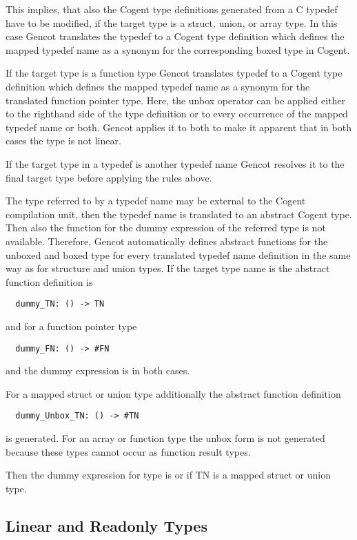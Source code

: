 This implies, that also the Cogent type definitions generated from a C typedef have to be modified, if
the target type is a struct, union, or array type. In this case Gencot translates the typedef 
to a Cogent type definition which defines the mapped typedef name as a synonym 
for the corresponding boxed type in Cogent.

If the target type is a function type Gencot translates typedef to a Cogent type definition which
defines the mapped typedef name as a synonym for the translated function pointer type. Here, the unbox
operator can be applied either to the righthand side of the type definition or to every occurrence
of the mapped typedef name or both. Gencot applies it to both to make it apparent that in both cases
the type is not linear.

If the target type in a typedef is another typedef name Gencot resolves it to the final target type
before applying the rules above.

The type referred to by a typedef name may be external to the Cogent compilation unit, then the typedef name
is translated to an abstract Cogent type. Then also the function for the dummy expression of the referred
type is not available. Therefore, Gencot automatically defines abstract functions for the unboxed and 
boxed type for every translated typedef name definition in the same way as for structure and union types.
If the target type name is  the abstract function definition is
\begin{verbatim}
  dummy_TN: () -> TN
\end{verbatim}
and for a function pointer type 
\begin{verbatim}
  dummy_FN: () -> #FN
\end{verbatim}
and the dummy expression is  in both cases.

For a mapped struct or union type additionally the abstract function definition
\begin{verbatim}
  dummy_Unbox_TN: () -> #TN
\end{verbatim}
is generated. For an array or function type the unbox form is not generated because these types cannot occur
as function result types.

Then the dummy expression for type  is  or  if 
TN is a mapped struct or union type.

\subsection{Linear and Readonly Types}
\label{design-types-readonly}

